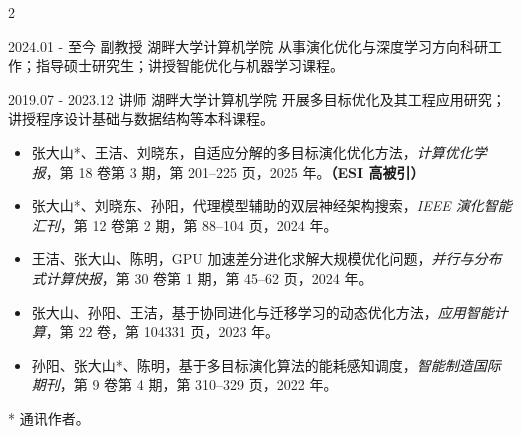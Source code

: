 \begin{paracol}{2}
\begin{rightcolumn}
\cvevent
{2024.01 - 至今}
	{副教授}
	{湖畔大学计算机学院}
	{从事演化优化与深度学习方向科研工作；指导硕士研究生；讲授智能优化与机器学习课程。}

\cvevent
{2019.07 - 2023.12}
	{讲师}
	{湖畔大学计算机学院}
	{开展多目标优化及其工程应用研究；讲授程序设计基础与数据结构等本科课程。}




\begin{itemize}[leftmargin=*]
	\itemsep 1.5pt
	\item 张大山*、王洁、刘晓东，自适应分解的多目标演化优化方法，\textit{计算优化学报}，第 18 卷第 3 期，第 201--225 页，2025 年。\textbf{（ESI 高被引）}
	\item 张大山*、刘晓东、孙阳，代理模型辅助的双层神经架构搜索，\textit{IEEE 演化智能汇刊}，第 12 卷第 2 期，第 88--104 页，2024 年。
	\item 王洁、张大山、陈明，GPU 加速差分进化求解大规模优化问题，\textit{并行与分布式计算快报}，第 30 卷第 1 期，第 45--62 页，2024 年。
	\item 张大山、孙阳、王洁，基于协同进化与迁移学习的动态优化方法，\textit{应用智能计算}，第 22 卷，第 104331 页，2023 年。
	\item 孙阳、张大山*、陈明，基于多目标演化算法的能耗感知调度，\textit{智能制造国际期刊}，第 9 卷第 4 期，第 310--329 页，2022 年。
\end{itemize}

\vspace{2pt}
{\small \textcolor{maincol}{* 通讯作者。}}

\vspace{2pt}



\end{rightcolumn}
\end{paracol}

